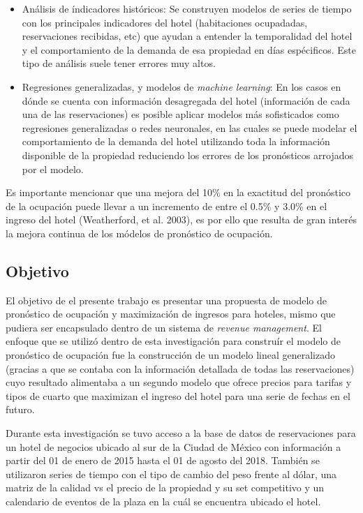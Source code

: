 \begin{itemize}
  \item Análisis de índicadores históricos: Se construyen modelos de series de tiempo con los principales indicadores del hotel (habitaciones ocupadadas, reservaciones recibidas, etc) que ayudan a entender la temporalidad del hotel y el comportamiento de la demanda de esa propiedad en días espécificos. Este tipo de análisis suele tener errores muy altos.
  \item Regresiones generalizadas, y modelos de \emph{machine learning}: En los casos en dónde se cuenta con información desagregada del hotel (información de cada una de las reservaciones) es posible aplicar modelos más sofisticados como regresiones generalizadas o redes neuronales, en las cuales se puede modelar el comportamiento de la demanda del hotel utilizando toda la información disponible de la propiedad reduciendo los errores de los pronósticos arrojados por el modelo.
\end{itemize}
Es importante mencionar que una mejora del 10\% en la exactitud del pronóstico de la ocupación puede llevar a un incremento de entre el 0.5\% y 3.0\% en el ingreso del hotel (Weatherford, et al. 2003), es por ello que resulta de gran interés la mejora continua de los módelos de pronóstico de ocupación.
\subsection*{Objetivo}
El objetivo de el presente trabajo es presentar una propuesta de modelo de pronóstico de ocupación y maximización de ingresos para hoteles, mismo que pudiera ser encapsulado dentro de un sistema de \emph{revenue management}. El enfoque que se utilizó dentro de esta investigación para construír el modelo de pronóstico de ocupación fue la construcción de un modelo lineal generalizado (gracias a que se contaba con la información detallada de todas las reservaciones) cuyo resultado alimentaba a un segundo modelo que ofrece precios para tarifas y tipos de cuarto que maximizan el ingreso del hotel para una serie de fechas en el futuro.

Durante esta investigación se tuvo acceso a la base de datos de reservaciones para un hotel de negocios ubicado al sur de la Ciudad de México con información a partir del 01 de enero de 2015 hasta el 01 de agosto del 2018. También se utilizaron series de tiempo con el tipo de cambio del peso frente al dólar, una matriz de la calidad vs el precio de la propiedad y su set competitivo y un calendario de eventos de la plaza en la cuál se encuentra ubicado el hotel.

